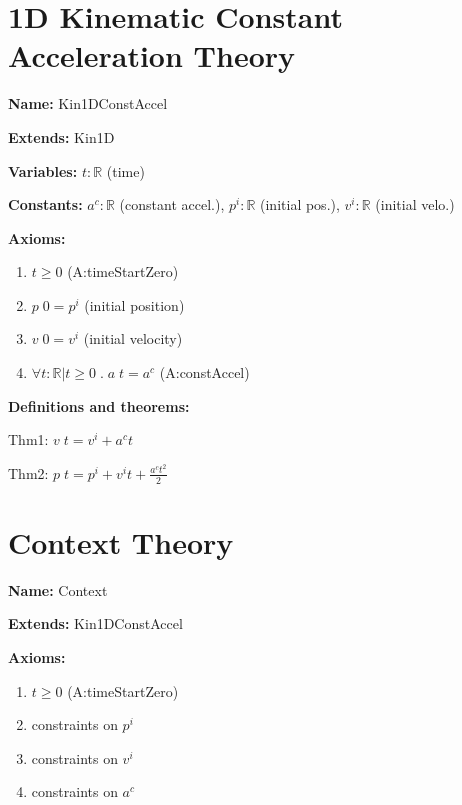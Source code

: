 \documentclass{article}
\begin{document}



\section{1D Kinematic Constant Acceleration Theory}

\noindent \textbf{Name:} Kin1DConstAccel

\noindent \textbf{Extends:} Kin1D

\noindent \textbf{Variables:} $t: {\mathbb{R}}$ (time)

\noindent \textbf{Constants:} ${a^c}: {\mathbb{R}}$ 
(constant accel.), ${p^i}: {\mathbb{R}}$ (initial pos.), ${v^i}: {\mathbb{R}}$ (initial velo.)

\noindent \textbf{Axioms:}

\begin{enumerate}
    \item $t \geq 0$ (A:timeStartZero)
    \item $p \; 0 = p^i$ (initial position)
    \item $v \; 0 = v^i$ (initial velocity)
    \item $\forall t: \mathbb{R} | t \geq 0 \; . \; a \; t = a^c$ (A:constAccel)
\end{enumerate}

\noindent \textbf{Definitions and theorems:}

Thm1: $v \; t = v^i + a^c t$

Thm2: $p \; t = p^i + v^i t + \frac{a^c t^2}{2}$

\section{Context Theory}

\noindent \textbf{Name:} Context

\noindent \textbf{Extends:} Kin1DConstAccel

\noindent \textbf{Axioms:}

\begin{enumerate}
    \item $t \geq 0$ (A:timeStartZero)
    \item constraints on $p^i$
    \item constraints on $v^i$
    \item constraints on $a^c$
\end{enumerate}
\end{document}
